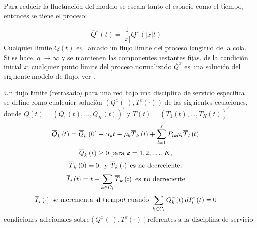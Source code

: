 Para reducir la fluctuaci\'on del modelo se escala tanto el
espacio como el tiempo, entonces se tiene el proceso:

\begin{equation}
\overline{Q}^{x}\left(t\right)=\frac{1}{|x|}Q^{x}\left(|x|t\right)
\end{equation}
Cualquier l\'imite $\overline{Q}\left(t\right)$ es llamado un
flujo l\'imite del proceso longitud de la cola. Si se hace
$|q|\rightarrow\infty$ y se mantienen las componentes restantes
fijas, de la condici\'on inicial $x$, cualquier punto l\'imite del
proceso normalizado $\overline{Q}^{x}$ es una soluci\'on del
siguiente modelo de flujo, ver \cite{Dai}.

\begin{Def}
Un flujo l\'imite (retrasado) para una red bajo una disciplina de
servicio espec\'ifica se define como cualquier soluci\'on
 $\left(Q^{x}\left(\cdot\right),T^{x}\left(\cdot\right)\right)$ de las siguientes ecuaciones, donde
$\overline{Q}\left(t\right)=\left(\overline{Q}_{1}\left(t\right),\ldots,\overline{Q}_{K}\left(t\right)\right)^{'}$
y
$\overline{T}\left(t\right)=\left(\overline{T}_{1}\left(t\right),\ldots,\overline{T}_{K}\left(t\right)\right)^{'}$
\begin{equation}\label{Eq.3.8}
\overline{Q}_{k}\left(t\right)=\overline{Q}_{k}\left(0\right)+\alpha_{k}t-\mu_{k}\overline{T}_{k}\left(t\right)+\sum_{l=1}^{k}P_{lk}\mu_{l}\overline{T}_{l}\left(t\right)\\
\end{equation}
\begin{equation}\label{Eq.3.9}
\overline{Q}_{k}\left(t\right)\geq0\textrm{ para }k=1,2,\ldots,K,\\
\end{equation}
\begin{equation}\label{Eq.3.10}
\overline{T}_{k}\left(0\right)=0,\textrm{ y }\overline{T}_{k}\left(\cdot\right)\textrm{ es no decreciente},\\
\end{equation}
\begin{equation}\label{Eq.3.11}
\overline{I}_{i}\left(t\right)=t-\sum_{k\in C_{i}}\overline{T}_{k}\left(t\right)\textrm{ es no decreciente}\\
\end{equation}
\begin{equation}\label{Eq.3.12}
\overline{I}_{i}\left(\cdot\right)\textrm{ se incrementa al tiempo}t\textrm{ cuando }\sum_{k\in C_{i}}Q_{k}^{x}\left(t\right)dI_{i}^{x}\left(t\right)=0\\
\end{equation}
\begin{equation}\label{Eq.3.13}
\textrm{condiciones adicionales sobre
}\left(Q^{x}\left(\cdot\right),T^{x}\left(\cdot\right)\right)\textrm{
referentes a la disciplina de servicio}
\end{equation}
\end{Def}

